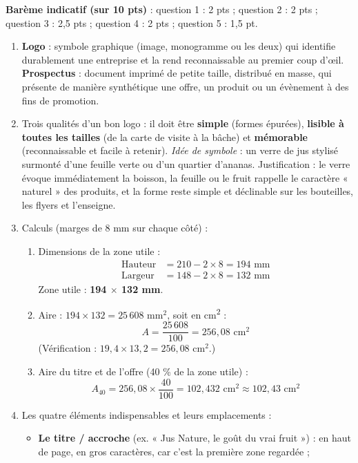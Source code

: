 \documentclass[11pt]{article}
\begin{document}
\begin{corrige}
\textbf{Barème indicatif (sur 10 pts)} : question 1 : 2 pts ; question 2 : 2 pts ; question 3 : 2,5 pts ; question 4 : 2 pts ; question 5 : 1,5 pt.

\begin{enumerate}
\item \textbf{Logo} : symbole graphique (image, monogramme ou les deux) qui identifie durablement une entreprise et la rend reconnaissable au premier coup d'œil. \textbf{Prospectus} : document imprimé de petite taille, distribué en masse, qui présente de manière synthétique une offre, un produit ou un évènement à des fins de promotion.
\item Trois qualités d'un bon logo : il doit être \textbf{simple} (formes épurées), \textbf{lisible à toutes les tailles} (de la carte de visite à la bâche) et \textbf{mémorable} (reconnaissable et facile à retenir). \emph{Idée de symbole} : un verre de jus stylisé surmonté d'une feuille verte ou d'un quartier d'ananas. Justification : le verre évoque immédiatement la boisson, la feuille ou le fruit rappelle le caractère « naturel » des produits, et la forme reste simple et déclinable sur les bouteilles, les flyers et l'enseigne.
\item Calculs (marges de 8 mm sur chaque côté) :
\begin{enumerate}
\item Dimensions de la zone utile :
\begin{align*}
\text{Hauteur} &= 210 - 2 \times 8 = 194 \text{ mm}\\
\text{Largeur} &= 148 - 2 \times 8 = 132 \text{ mm}
\end{align*}
Zone utile : \textbf{194 $\times$ 132 mm}.
\item Aire : $194 \times 132 = 25\,608 \text{ mm}^2$, soit en cm\textsuperscript{2} :
\[ A = \dfrac{25\,608}{100} = 256{,}08 \text{ cm}^2 \]
(Vérification : $19{,}4 \times 13{,}2 = 256{,}08 \text{ cm}^2$.)
\item Aire du titre et de l'offre (40 \% de la zone utile) :
\[ A_{40} = 256{,}08 \times \dfrac{40}{100} = 102{,}432 \text{ cm}^2 \approx 102{,}43 \text{ cm}^2 \]
\end{enumerate}
\item Les quatre éléments indispensables et leurs emplacements :
\begin{itemize}
\item \textbf{Le titre / accroche} (ex. « Jus Nature, le goût du vrai fruit ») : en haut de page, en gros caractères, car c'est la première zone regardée ;

\end{itemize}
\end{enumerate}
\end{corrige}
\end{document}
